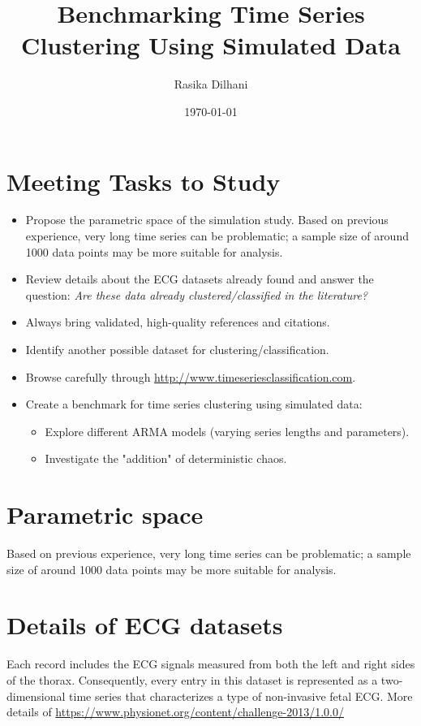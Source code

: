 \documentclass[12pt,a4paper]{article}
\title{Benchmarking Time Series Clustering Using Simulated Data}
\author{Rasika Dilhani}
\date{\today}
\begin{document}
	\maketitle
	
	\section*{Meeting Tasks to Study}
	
	\begin{itemize}
		\item Propose the parametric space of the simulation study.  
		Based on previous experience, very long time series can be problematic; a sample size of around 1000 data points may be more suitable for analysis.
		
		\item Review details about the ECG datasets already found and answer the question:  
		\textit{Are these data already clustered/classified in the literature?}
		
		\item Always bring validated, high-quality references and citations.
		
		\item Identify another possible dataset for clustering/classification.
		
		\item Browse carefully through \url{http://www.timeseriesclassification.com}.
		
		\item Create a benchmark for time series clustering using simulated data:
		\begin{itemize}
			\item Explore different ARMA models (varying series lengths and parameters).
			\item Investigate the "addition" of deterministic chaos.
		\end{itemize}
		
	\end{itemize}

	
\section{Parametric space}
  
Based on previous experience, very long time series can be problematic; a sample size of around 1000 data points may be more suitable for analysis.

\section{Details of ECG datasets}
Each record includes the ECG signals measured from both the left and right sides of the thorax. Consequently, every entry in this dataset is represented as a two-dimensional time series that characterizes a type of non-invasive fetal ECG.  More details of \url{https://www.physionet.org/content/challenge-2013/1.0.0/}
\end{document}
